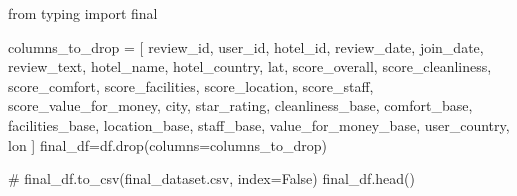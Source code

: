 \documentclass[
  letterpaper,
  DIV=11,
  numbers=noendperiod]{scrartcl}
\newenvironment{Shaded}{\begin{snugshade}}{\end{snugshade}}
\newcommand{\CommentTok}[1]{\textcolor[rgb]{0.37,0.37,0.37}{#1}}
\newcommand{\ImportTok}[1]{\textcolor[rgb]{0.00,0.46,0.62}{#1}}
\newcommand{\NormalTok}[1]{\textcolor[rgb]{0.00,0.23,0.31}{#1}}
\newcommand{\OperatorTok}[1]{\textcolor[rgb]{0.37,0.37,0.37}{#1}}
\newcommand{\StringTok}[1]{\textcolor[rgb]{0.13,0.47,0.30}{#1}}
\begin{document}
\begin{Shaded}
\begin{Highlighting}[]

\ImportTok{from}\NormalTok{ typing }\ImportTok{import}\NormalTok{ final}


\NormalTok{columns\_to\_drop }\OperatorTok{=}\NormalTok{ [}
    \StringTok{\textquotesingle{}review\_id\textquotesingle{}}\NormalTok{,         }
    \StringTok{\textquotesingle{}user\_id\textquotesingle{}}\NormalTok{,           }
    \StringTok{\textquotesingle{}hotel\_id\textquotesingle{}}\NormalTok{,          }
    \StringTok{\textquotesingle{}review\_date\textquotesingle{}}\NormalTok{,      }
    \StringTok{\textquotesingle{}join\_date\textquotesingle{}}\NormalTok{,          }
    \StringTok{\textquotesingle{}review\_text\textquotesingle{}}\NormalTok{,       }
    \StringTok{\textquotesingle{}hotel\_name\textquotesingle{}}\NormalTok{,        }
    \StringTok{\textquotesingle{}hotel\_country\textquotesingle{}}\NormalTok{,   }
    \StringTok{\textquotesingle{}lat\textquotesingle{}}\NormalTok{, }
    \StringTok{\textquotesingle{}score\_overall\textquotesingle{}}\NormalTok{,}
    \StringTok{\textquotesingle{}score\_cleanliness\textquotesingle{}}\NormalTok{,}
    \StringTok{\textquotesingle{}score\_comfort\textquotesingle{}}\NormalTok{,}
    \StringTok{\textquotesingle{}score\_facilities\textquotesingle{}}\NormalTok{,}
    \StringTok{\textquotesingle{}score\_location\textquotesingle{}}\NormalTok{,}
    \StringTok{\textquotesingle{}score\_staff\textquotesingle{}}\NormalTok{,}
    \StringTok{\textquotesingle{}score\_value\_for\_money\textquotesingle{}}\NormalTok{,}
    \StringTok{\textquotesingle{}city\textquotesingle{}}\NormalTok{,}
    \StringTok{\textquotesingle{}star\_rating\textquotesingle{}}\NormalTok{,}
    \StringTok{\textquotesingle{}cleanliness\_base\textquotesingle{}}\NormalTok{,}
    \StringTok{\textquotesingle{}comfort\_base\textquotesingle{}}\NormalTok{,}
    \StringTok{\textquotesingle{}facilities\_base\textquotesingle{}}\NormalTok{,}
    \StringTok{\textquotesingle{}location\_base\textquotesingle{}}\NormalTok{,}
    \StringTok{\textquotesingle{}staff\_base\textquotesingle{}}\NormalTok{,}
    \StringTok{\textquotesingle{}value\_for\_money\_base\textquotesingle{}}\NormalTok{,   }
    \StringTok{\textquotesingle{}user\_country\textquotesingle{}}\NormalTok{,            }
    \StringTok{\textquotesingle{}lon\textquotesingle{}}  
\NormalTok{]}
\NormalTok{final\_df}\OperatorTok{=}\NormalTok{df.drop(columns}\OperatorTok{=}\NormalTok{columns\_to\_drop)}

\CommentTok{\# final\_df.to\_csv(\textquotesingle{}final\_dataset.csv\textquotesingle{}, index=False)   }
\NormalTok{final\_df.head()}
\end{Highlighting}
\end{Shaded}
\end{document}
